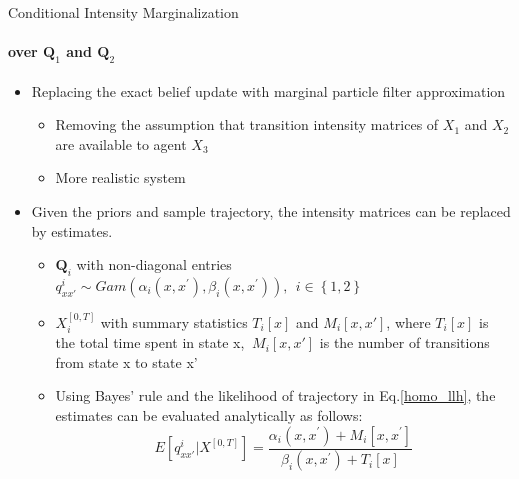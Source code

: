 \documentclass[
	english,%
	aspectratio=169,%
	color={accentcolor=3b},
	logo=true,%
	colorframetitle=false,%
	]{tudabeamer}
\begin{document}
\begin{frame}{Conditional Intensity Marginalization}
\framesubtitle{over $ \textbf{Q}_{1} $ and $ \textbf{Q}_{2} $}
\begin{itemize}
	\item Replacing the exact belief update with marginal particle filter approximation
	\begin{itemize}
		\item Removing the assumption that transition intensity matrices of $ X_{1} $ and $ X_{2} $ are available to agent $ X_{3} $
		\item More realistic system
	\end{itemize}
	\item Given the priors and sample trajectory, the intensity matrices can be replaced by estimates. \cite{Studer2016}
	\begin{itemize}
		\item $\textbf{Q}_{i}$ with non-diagonal entries $ q^{i}_{xx'}\sim Gam(\alpha_{i}\left(x, x^{\prime}\right), \beta_{i}\left(x, x^{\prime}\right)),\ \ i \in \left\lbrace 1,2\right\rbrace $
		\item $X_{i}^{[0,T]}$ with summary statistics $ T_{i}[x] $ and $ M_{i}[x,x'] $, where $ T_{i}[x] $ is the total time spent in state x, $\ M_{i}[x,x'] $ is the number of transitions from state x to state x'
		\item Using Bayes' rule and the likelihood of trajectory in Eq.\ref{homo_llh}, the estimates can be evaluated analytically as follows:
		\begin{equation}
		E\left[ q^{i}_{xx'} | X^{[0,T]}\right]=\frac{\alpha_{i}\left(x, x^{\prime}\right)+M_{i}\left[x, x^{\prime}\right]}{\beta_{i}\left(x, x^{\prime}\right)+T_{i}[x]}
		\end{equation}
	\end{itemize}
\end{itemize}
\end{frame}
\end{document}
